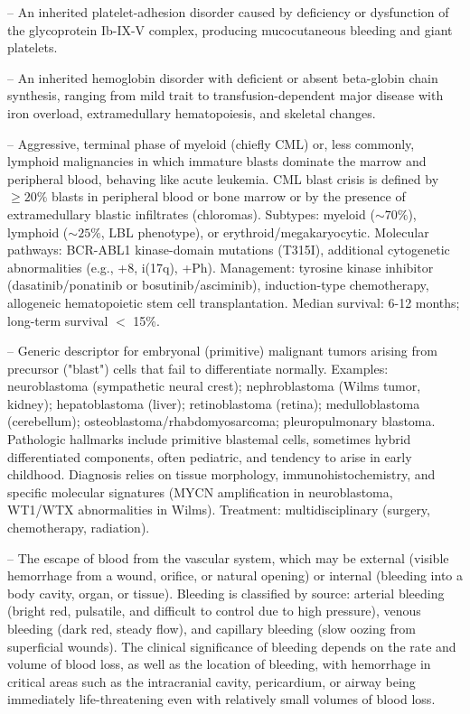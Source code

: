 -- An inherited platelet-adhesion disorder caused by deficiency or dysfunction of the glycoprotein Ib-IX-V complex, producing mucocutaneous bleeding and giant platelets.

-- An inherited hemoglobin disorder with deficient or absent beta-globin chain synthesis, ranging from mild trait to transfusion-dependent major disease with iron overload, extramedullary hematopoiesis, and skeletal changes.

-- Aggressive, terminal phase of myeloid (chiefly CML) or, less commonly, lymphoid malignancies in which immature blasts dominate the marrow and peripheral blood, behaving like acute leukemia. CML blast crisis is defined by $\ge 20\%$ blasts in peripheral blood or bone marrow or by the presence of extramedullary blastic infiltrates (chloromas). Subtypes: myeloid ($\sim 70\%$), lymphoid ($\sim 25\%$, LBL phenotype), or erythroid/megakaryocytic. Molecular pathways: BCR-ABL1 kinase-domain mutations (T315I), additional cytogenetic abnormalities (e.g., +8, i(17q), +Ph). Management: tyrosine kinase inhibitor (dasatinib/ponatinib or bosutinib/asciminib), induction-type chemotherapy, allogeneic hematopoietic stem cell transplantation. Median survival: 6-12 months; long-term survival $<$ 15\%.

-- Generic descriptor for embryonal (primitive) malignant tumors arising from precursor ("blast") cells that fail to differentiate normally. Examples: neuroblastoma (sympathetic neural crest); nephroblastoma (Wilms tumor, kidney); hepatoblastoma (liver); retinoblastoma (retina); medulloblastoma (cerebellum); osteoblastoma/rhabdomyosarcoma; pleuropulmonary blastoma. Pathologic hallmarks include primitive blastemal cells, sometimes hybrid differentiated components, often pediatric, and tendency to arise in early childhood. Diagnosis relies on tissue morphology, immunohistochemistry, and specific molecular signatures (MYCN amplification in neuroblastoma, WT1/WTX abnormalities in Wilms). Treatment: multidisciplinary (surgery, chemotherapy, radiation).

-- The escape of blood from the vascular system, which may be external (visible hemorrhage from a wound, orifice, or natural opening) or internal (bleeding into a body cavity, organ, or tissue). Bleeding is classified by source: arterial bleeding (bright red, pulsatile, and difficult to control due to high pressure), venous bleeding (dark red, steady flow), and capillary bleeding (slow oozing from superficial wounds). The clinical significance of bleeding depends on the rate and volume of blood loss, as well as the location of bleeding, with hemorrhage in critical areas such as the intracranial cavity, pericardium, or airway being immediately life-threatening even with relatively small volumes of blood loss.

